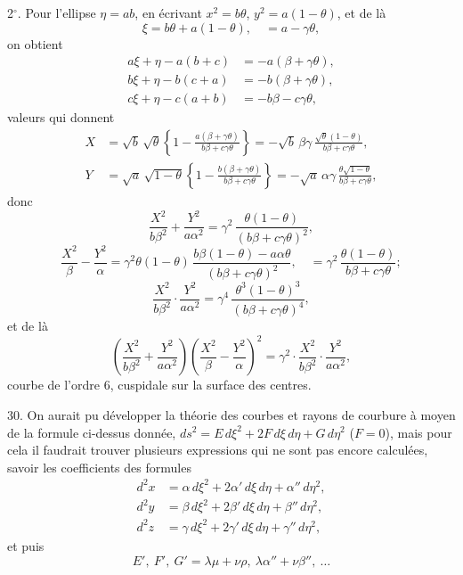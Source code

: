 \documentclass[11pt,a4paper]{book}
\begin{document}
2$^\circ$. Pour l'ellipse $\eta = ab$, en \'ecrivant $x^2 = b\theta$, $y^2 = a(1-\theta)$, et de l\`a
\[
\xi = b\theta + a(1-\theta), \quad = a - \gamma\theta,
\]
on obtient
\begin{align*}
a\xi + \eta - a(b+c) &= -a(\beta + \gamma\theta), \\
b\xi + \eta - b(c+a) &= -b(\beta + \gamma\theta), \\
c\xi + \eta - c(a+b) &= -b\beta - c\gamma\theta,
\end{align*}
valeurs qui donnent
\begin{align*}
X &= \sqrt{b}\,\sqrt{\theta}\left\{1 - \frac{a(\beta+\gamma\theta)}{b\beta+c\gamma\theta}\right\}
= -\sqrt{b}\,\beta\gamma\,\frac{\sqrt{\theta}(1-\theta)}{b\beta+c\gamma\theta},\\
Y &= \sqrt{a}\,\sqrt{1-\theta}\left\{1 - \frac{b(\beta+\gamma\theta)}{b\beta+c\gamma\theta}\right\}
= -\sqrt{a}\,\alpha\gamma\,\frac{\theta\sqrt{1-\theta}}{b\beta+c\gamma\theta},
\end{align*}
donc
\[
\frac{X^2}{b\beta^2} + \frac{Y^2}{a\alpha^2}
= \gamma^2\,\frac{\theta(1-\theta)}{(b\beta+c\gamma\theta)^2},
\]
\[
\frac{X^2}{\beta} - \frac{Y^2}{\alpha}
= \gamma^2\theta(1-\theta)\,\frac{b\beta(1-\theta)-a\alpha\theta}{(b\beta+c\gamma\theta)^2},
\quad = \gamma^2\,\frac{\theta(1-\theta)}{b\beta+c\gamma\theta};
\]
\[
\frac{X^2}{b\beta^2}\cdot\frac{Y^2}{a\alpha^2}
= \gamma^4\,\frac{\theta^3(1-\theta)^3}{(b\beta+c\gamma\theta)^4},
\]
et de l\`a
\[
\left(\frac{X^2}{b\beta^2} + \frac{Y^2}{a\alpha^2}\right)
\left(\frac{X^2}{\beta} - \frac{Y^2}{\alpha}\right)^2
= \gamma^2\cdot\frac{X^2}{b\beta^2}\cdot\frac{Y^2}{a\alpha^2},
\]
courbe de l'ordre 6, cuspidale sur la surface des centres.

30. On aurait pu d\'evelopper la th\'eorie des courbes et rayons de courbure \`a
moyen de la formule ci-dessus donn\'ee,
$ds^2 = E\,d\xi^2 + 2F\,d\xi\,d\eta + G\,d\eta^2$ ($F=0$),
mais pour cela il faudrait trouver plusieurs expressions qui ne sont pas encore
calcul\'ees, savoir les coefficients des formules
\begin{align*}
d^2x &= \alpha\,d\xi^2 + 2\alpha'\,d\xi\,d\eta + \alpha''\,d\eta^2,\\
d^2y &= \beta\,d\xi^2 + 2\beta'\,d\xi\,d\eta + \beta''\,d\eta^2,\\
d^2z &= \gamma\,d\xi^2 + 2\gamma'\,d\xi\,d\eta + \gamma''\,d\eta^2,
\end{align*}
et puis
\[
E',\ F',\ G' = \lambda\mu + \nu\rho,\ \lambda\alpha'' + \nu\beta'',\ \ldots
\]
\end{document}
